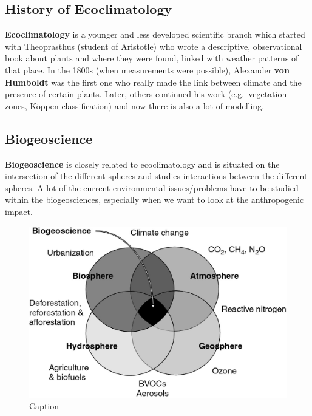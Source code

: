\documentclass[oneside]{book}
\begin{document}
\subsection{History of Ecoclimatology}\label{history-of-ecoclimatology}

\textbf{Ecoclimatology} is a younger and less developed scientific
branch which started with Theoprasthus (student of Aristotle) who wrote
a descriptive, observational book about plants and where they were
found, linked with weather patterns of that place. In the 1800s (when
measurements were possible), Alexander \textbf{von Humboldt} was the
first one who really made the link between climate and the presence of
certain plants. Later, others continued his work (e.g.~vegetation zones,
Köppen classification) and now there is also a lot of modelling.

\subsection{Biogeoscience}\label{biogeoscience}

\textbf{Biogeoscience} is closely related to ecoclimatology and is
situated on the intersection of the different spheres and studies
interactions between the different spheres. A lot of the current
environmental issues/problems have to be studied within the
biogeosciences, especially when we want to look at the anthropogenic
impact.

\begin{figure}

{\centering \includegraphics[width=0.5\linewidth]{figures/Figure19} 

}

\caption{Caption}\label{fig:Biogeoscience}
\end{figure}
\end{document}
